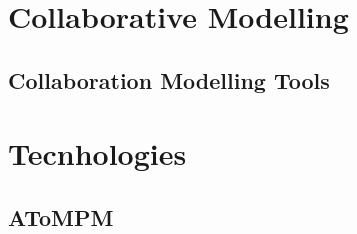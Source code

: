 
\section{Collaborative Modelling}


\subsection{Collaboration Modelling Tools}
\label{subsec:}





\section{Tecnhologies}
\label{sec:}




\subsection{AToMPM}
\label{subsec:}





